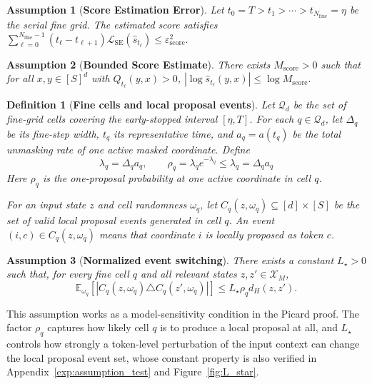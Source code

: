 \documentclass{article}
\newtheorem{definition}{Definition}[section]
\newtheorem{assumption}{Assumption}[section]
\begin{document}
\begin{assumption}[\bf Score Estimation Error]
\label{ass:score-estimation-error}
Let \(t_0=T>t_1>\cdots>t_{N_{\mathrm{fine}}}=\eta\) be the serial fine grid. The estimated score satisfies
$    \sum_{\ell=0}^{N_{\mathrm{fine}}-1}
    (t_\ell-t_{\ell+1})
    \mathcal L_{\mathrm{SE}}(\widehat s_{t_\ell})
    \le
    \varepsilon^2_{\mathrm{score}}.$
\end{assumption}

\begin{assumption}[\bf Bounded Score Estimate]
\label{ass:bounded-score-estimate}
There exists $M_{\mathrm{score}}>0$ such that for all \(x,y\in[S]^d\) with \(Q_{t_\ell}(y,x)>0\),
$    |\log \widehat s_{t_\ell}(y,x)|
    \le \log M_{\mathrm{score}}.$
\end{assumption}

\begin{definition}[\bf Fine cells and local proposal events]
\label{def:fine-cell}
Let $\mathcal Q_d$ be the set of fine-grid cells covering the early-stopped interval $[\eta,T]$. For each $q\in\mathcal Q_d$, let $\Delta_q$ be its fine-step width, $t_q$ its representative time, and $a_q=a(t_q)$ be the total unmasking rate of one active masked coordinate. Define
\[
\lambda_q=\Delta_q a_q,
\qquad
\rho_q=\lambda_q e^{-\lambda_q}\le \lambda_q=\Delta_q a_q
\]
Here $\rho_q$ is the one-proposal probability at one active coordinate in cell $q$.

For an input state $z$ and cell randomness $\omega_q$, let
$C_q(z,\omega_q)\subseteq[d]\times[S]$
be the set of valid local proposal events generated in cell $q$. An event $(i,c)\in C_q(z,\omega_q)$ means that coordinate $i$ is locally proposed as token $c$.
\end{definition}

\begin{assumption}[\bf Normalized event switching]
\label{ass:event-switching}
There exists a constant $L_\star>0$ such that, for every fine cell $q$ and all relevant states $z,z'\in\mathcal X_M$,
\[
\mathbb E_{\omega_q}\left[\left|C_q(z,\omega_q)\triangle C_q(z',\omega_q)\right|\right]
\le
L_\star\rho_q d_H(z,z').
\]
\end{assumption}
This assumption works as a model-sensitivity condition in the Picard proof. The factor $\rho_q$ captures how likely cell $q$ is to produce a local proposal at all, and $L_\star$ controls how strongly a token-level perturbation of the input context can change the local proposal event set, whose constant property is also verified in Appendix~\ref{exp:assumption_test} and Figure~\ref{fig:L_star}.
\end{document}
